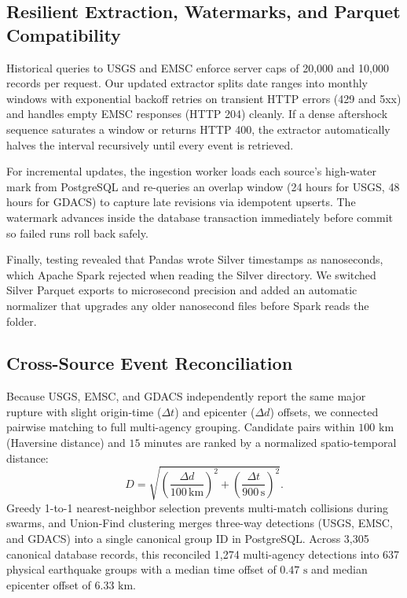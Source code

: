 \subsection{Resilient Extraction, Watermarks, and Parquet Compatibility}
Historical queries to USGS and EMSC enforce server caps of 20,000 and 10,000 records per request. Our updated extractor splits date ranges into monthly windows with exponential backoff retries on transient HTTP errors (429 and 5xx) and handles empty EMSC responses (HTTP 204) cleanly. If a dense aftershock sequence saturates a window or returns HTTP 400, the extractor automatically halves the interval recursively until every event is retrieved.

For incremental updates, the ingestion worker loads each source's high-water mark from PostgreSQL and re-queries an overlap window (24 hours for USGS, 48 hours for GDACS) to capture late revisions via idempotent upserts. The watermark advances inside the database transaction immediately before commit so failed runs roll back safely.

Finally, testing revealed that Pandas wrote Silver timestamps as nanoseconds, which Apache Spark rejected when reading the Silver directory. We switched Silver Parquet exports to microsecond precision and added an automatic normalizer that upgrades any older nanosecond files before Spark reads the folder.

\subsection{Cross-Source Event Reconciliation}
Because USGS, EMSC, and GDACS independently report the same major rupture with slight origin-time ($\Delta t$) and epicenter ($\Delta d$) offsets, we connected pairwise matching to full multi-agency grouping. Candidate pairs within $100\text{ km}$ (Haversine distance) and $15\text{ minutes}$ are ranked by a normalized spatio-temporal distance:
\begin{equation}
    D = \sqrt{\left(\frac{\Delta d}{100\,\text{km}}\right)^2 + \left(\frac{\Delta t}{900\,\text{s}}\right)^2}.
    \label{eq:st_cost}
\end{equation}
Greedy 1-to-1 nearest-neighbor selection prevents multi-match collisions during swarms, and Union-Find clustering merges three-way detections (USGS, EMSC, and GDACS) into a single canonical group ID in PostgreSQL. Across 3,305 canonical database records, this reconciled 1,274 multi-agency detections into 637 physical earthquake groups with a median time offset of $0.47\text{ s}$ and median epicenter offset of $6.33\text{ km}$.
